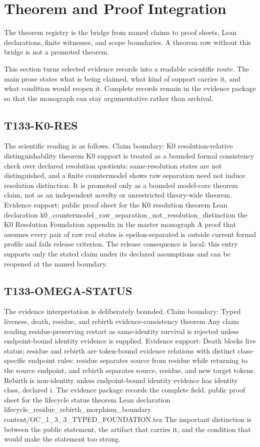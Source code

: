 \section{Theorem and Proof Integration}
The theorem registry is the bridge from named claims to proof sheets, Lean declarations, finite witnesses, and scope boundaries. A theorem row without this bridge is not a promoted theorem.

This section turns selected evidence records into a readable scientific route. The main prose states what is being claimed, what kind of support carries it, and what condition would reopen it. Complete records remain in the evidence package so that the monograph can stay argumentative rather than archival.

\subsection{T133-K0-RES}
The scientific reading is as follows. Claim boundary: K0 resolution-relative distinguishability theorem K0 support is treated as a bounded formal consistency check over declared resolution quotients: same-resolution states are not distinguished, and a finite countermodel shows raw separation need not induce resolution distinction. It is promoted only as a bounded model-core theorem claim, not as an independent novelty or unrestricted theory-wide theorem. Evidence support: public proof sheet for the K0 resolution theorem Lean declaration k0\_countermodel\_raw\_separation\_not\_resolution\_distinction the K0 Resolution Foundation appendix in the master monograph A proof that assumes every pair of raw real states is epsilon-separated is outside current formal profile and fails release criterion. The release consequence is local: this entry supports only the stated claim under its declared assumptions and can be reopened at the named boundary.

\subsection{T133-OMEGA-STATUS}
The evidence interpretation is deliberately bounded. Claim boundary: Typed liveness, death, residue, and rebirth evidence-consistency theorem Any claim reading residue-preserving restart as same-identity survival is rejected unless endpoint-bound identity evidence is supplied. Evidence support: Death blocks live status; residue and rebirth are token-bound evidence relations with distinct class-specific endpoint rules: residue separates source from residue while returning to the source endpoint, and rebirth separates source, residue, and new target tokens. Rebirth is non-identity unless endpoint-bound identity evidence has identity class, declared i. The evidence package records the complete field. public proof sheet for the lifecycle status theorem Lean declaration lifecycle\_residue\_rebirth\_morphism\_boundary content/OC\_1\_3\_3\_TYPED\_FOUNDATION.tex The important distinction is between the public statement, the artifact that carries it, and the condition that would make the statement too strong.

